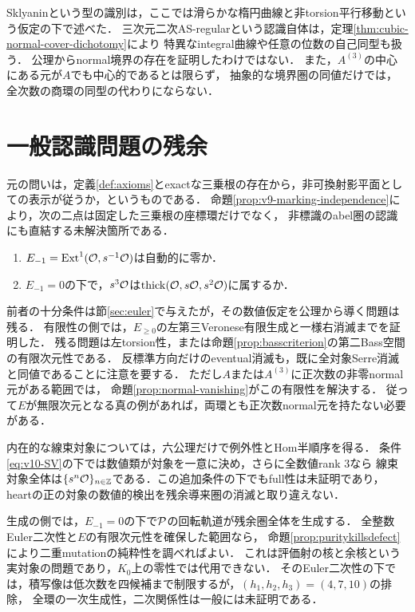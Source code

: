 \documentclass[11pt,a4paper]{ltjsarticle}
\begin{document}
Sklyaninという型の識別は，ここでは滑らかな楕円曲線と非torsion平行移動という仮定の下で述べた．
三次元二次AS-regularという認識自体は，定理\ref{thm:cubic-normal-cover-dichotomy}により
特異なintegral曲線や任意の位数の自己同型も扱う．
公理からnormal境界の存在を証明したわけではない．
また，$A^{(3)}$の中心にある元が$A$でも中心的であるとは限らず，
抽象的な境界圏の同値だけでは，全次数の商環の同型の代わりにならない．

\section{一般認識問題の残余}\label{sec:remaining}
元の問いは，定義\ref{def:axioms}とexactな三乗根の存在から，非可換射影平面としての表示が従うか，というものである．
命題\ref{prop:v9-marking-independence}により，次の二点は固定した三乗根の座標環だけでなく，
非標識のabel圏の認識にも直結する未解決箇所である．
\begin{enumerate}
\item $E_{-1}=\operatorname{Ext}^1(\mathcal O,s^{-1}\mathcal O)$は自動的に零か．
\item $E_{-1}=0$の下で，$s^3\mathcal O$は$\operatorname{thick}(\mathcal O,s\mathcal O,s^2\mathcal O)$に属するか．
\end{enumerate}
前者の十分条件は節\ref{sec:euler}で与えたが，その数値仮定を公理から導く問題は残る．
有限性の側では，$E_{\geq0}$の左第三Veronese有限生成と一様右消滅までを証明した．
残る問題は左torsion性，または命題\ref{prop:basscriterion}の第二Bass空間の有限次元性である．
反標準方向だけのeventual消滅も，既に全対象Serre消滅と同値であることに注意を要する．
ただし$A$または$A^{(3)}$に正次数の非零normal元がある範囲では，
命題\ref{prop:normal-vanishing}がこの有限性を解決する．
従って$E$が無限次元となる真の例があれば，両環とも正次数normal元を持たない必要がある．

内在的な線束対象については，六公理だけで例外性とHom半順序を得る．
条件\eqref{eq:v10-SV}の下では数値類が対象を一意に決め，さらに全数値rank $3$なら
線束対象全体は$\{s^n\mathcal O\}_{n\in\mathbb Z}$である．この追加条件の下でもfull性は未証明であり，
heartの正の対象の数値的検出を残余導来圏の消滅と取り違えない．

生成の側では，$E_{-1}=0$の下で$\mathcal P$の回転軌道が残余圏全体を生成する．
全整数Euler二次性と$E$の有限次元性を確保した範囲なら，
命題\ref{prop:puritykillsdefect}により二重mutationの純粋性を調べればよい．
これは評価射の核と余核という実対象の問題であり，$K_0$上の零性では代用できない．
そのEuler二次性の下では，積写像は低次数を四候補まで制限するが，$(h_1,h_2,h_3)=(4,7,10)$の排除，
全環の一次生成性，二次関係性は一般には未証明である．
\end{document}
